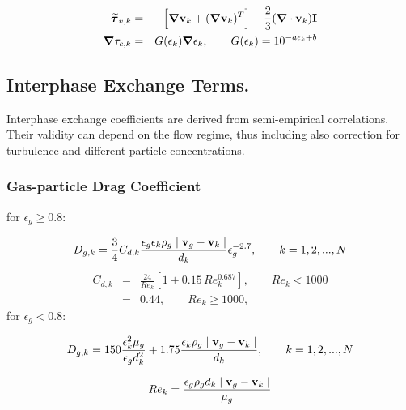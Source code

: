 \begin{eqnarray}
\mbox{\boldmath $\widetilde\tau$}_{v,k} & = & 
\Big[ \mbox{\boldmath $\nabla$}{\bf v}_{k}+
(\mbox{\boldmath $\nabla$}{\bf v}_{k})^{T} \Big]-
\frac{2}{3} (\mbox{\boldmath $\nabla$}\cdot {\bf v}_{k}){\bf I}
\label{eq:solid_viscous}\\
\mbox{\boldmath $\nabla$} \tau_{c,k} & = & 
G(\epsilon_k) \mbox{\boldmath $\nabla$} \epsilon_k,
\qquad G(\epsilon_k) = 10^{-a \epsilon_k + b}
\label{eq:solid_coulombic}
\end{eqnarray}

\subsection{Interphase Exchange Terms.}
Interphase exchange coefficients are derived from semi-empirical correlations.
Their validity can depend on the flow regime, thus including also 
correction for turbulence and different particle concentrations.

\subsubsection{\hspace{1cm}Gas-particle Drag Coefficient}

for $\epsilon_g \geq 0.8$:

\begin{equation}
D_{g,k}=\frac{3}{4}C_{d,k}\frac{\epsilon_{g}\epsilon_{k}\rho_{g}\mid 
{\bf v}_{g}- {\bf v}_{k}\mid}{d_{k}}\epsilon_{g}^{-2.7}, 
\qquad k=1,2,...,N
\label{eq:drag_less}
\end{equation}
%
\begin{eqnarray}
C_{d,k} & = & \frac{24}{Re_{k}}[1+0.15\, Re_{k}^{0.687}], 
\qquad Re_{k} < 1000 \\
& = & 0.44, \qquad Re_{k} \geq 1000,
\label{eq:drag_coeff1}
\end{eqnarray}
%
\noindent
for $\epsilon_g < 0.8$:

\begin{equation}
D_{g,k}=150 \frac{\epsilon_{k}^{2}\mu_{g}}{\epsilon_{g} d_{k}^{2}} +
1.75 \frac{\epsilon_{k}\rho_{g}\mid {\bf v}_{g}-
{\bf v}_{k}\mid}{d_{k}}, \qquad k=1,2,...,N
\label{eq:drag_more}
\end{equation}

\begin{equation}
Re_{k}=\frac{\epsilon_{g}\rho_{g}d_{k}\mid 
{\bf v}_{g}-{\bf v}_{k}\mid}{\mu_{g}}
\label{eq:reynolds}
\end{equation}

